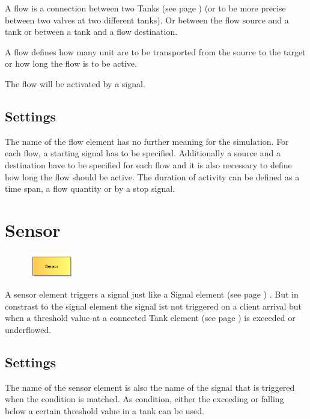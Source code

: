 A flow is a connection between two Tanks (see page \pageref{ref:ModelElementTank}) 
(or to be more precise between two valves at two different tanks).
Or between the flow source and a tank or between a tank and a flow destination.

A flow defines how many unit are to be transported from the source to the target
or how long the flow is to be active.

The flow will be activated by a signal.

\subsection*{Settings}

The name of the flow element has no further meaning for the simulation.
For each flow, a starting signal has to be specified.
Additionally a source and a destination have to be specified for each flow
and it is also necessary to define how long the flow should be active.
The duration of activity can be defined as a time span, a flow quantity or by a stop signal.


\section{Sensor}
\label{ref:ModelElementTankSensor}

\begin{figure}
\vspace{-22pt}
\includegraphics[width=2cm]{imageModelElementTankSensor.png}
\vspace{-22pt}
\end{figure}

A sensor element triggers a signal just like a Signal element (see page \pageref{ref:ModelElementSignal}) .
But in constrast to the signal element the signal ist not triggered on a client arrival
but when a threshold value at a connected Tank element (see page \pageref{ref:ModelElementTank}) 
is exceeded or underflowed.

\subsection*{Settings}

The name of the sensor element is also the name of the signal that is triggered when the condition is matched.
As condition, either the exceeding or falling below a certain threshold value in a tank can be used.


